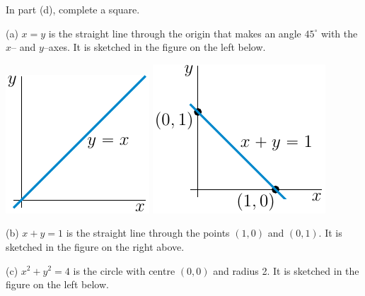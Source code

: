 \begin{hint}
In part (d), complete a square.
\end{hint}

\begin{answer}
(a) $x=y$ is the straight line through the origin that makes an 
angle $45^\circ$ with the $x$-- and $y$--axes. It is sketched in the 
figure on the left below.

\begin{center}
     \includegraphics{fig/sec1_1_Q1a.pdf}\qquad\qquad
     \includegraphics{fig/sec1_1_Q1b.pdf}
\end{center}

(b) $x+y=1$ is the straight line through the points $(1,0)$ and
$(0,1)$. It is sketched in the figure on the right above.

(c) $x^2+y^2=4$ is the circle with centre $(0,0)$ and radius 2. It is 
sketched in the figure on the left below.


\end{answer}
